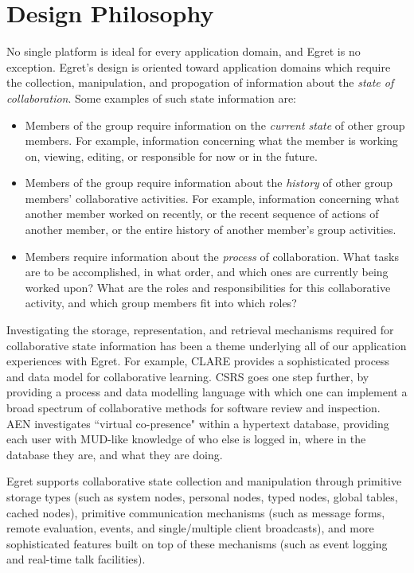 \section{Design Philosophy}

No single platform is ideal for every application domain, and Egret is no
exception.  Egret's design is oriented toward application
domains which require the collection, manipulation, and propogation of 
information about the {\em state of collaboration}. Some examples of such 
state information are:

\begin{itemize}

\item Members of the group require information on the {\em current
  state} of other group members. For example, information
  concerning what the member is working on, viewing, editing, or
  responsible for now or in the future.

\item Members of the group require information about the {\em history}
  of other group members' collaborative activities. For example,
  information concerning what another member worked on recently, or
  the recent sequence of actions of another member, or the entire
  history of another member's group activities.

\item Members require information about the {\em process} of
  collaboration. What tasks are to be accomplished, in what order, and
  which ones are currently being worked upon?  What are the roles and
  responsibilities for this collaborative activity, and which group
  members fit into which roles?

\end{itemize}

Investigating the storage, representation, and retrieval mechanisms
required for collaborative state information has been a theme underlying
all of our application experiences with Egret. For example, CLARE provides
a sophisticated process and data model for collaborative learning.  CSRS
goes one step further, by providing a process and data modelling language
with which one can implement a broad spectrum of collaborative methods for
software review and inspection.  AEN investigates ``virtual co-presence"
within a hypertext database, providing each user with MUD-like knowledge of
who else is logged in, where in the database they are, and what they are
doing.

Egret supports collaborative state collection and manipulation through
primitive storage types (such as system nodes, personal nodes, typed nodes,
global tables, cached nodes), primitive communication mechanisms (such as
message forms, remote evaluation, events, and single/multiple client
broadcasts), and more sophisticated features built on top of these
mechanisms (such as event logging and real-time talk facilities).


